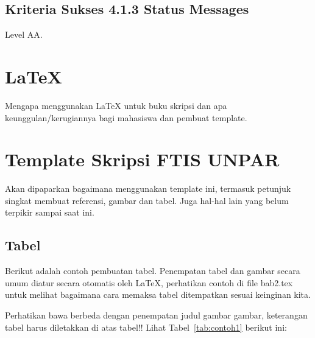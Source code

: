 \subsection{Kriteria Sukses 4.1.3 Status Messages}
\label{sec:kriteria_4.1.3}
Level AA.

\section{\LaTeX}
\label{sec:latex}

Mengapa menggunakan \LaTeX{} untuk buku skripsi dan apa keunggulan/kerugiannya bagi mahasiswa dan pembuat template. 



\section{Template Skripsi FTIS UNPAR}
\label{sec:template}
 
Akan dipaparkan bagaimana menggunakan template ini, termasuk petunjuk singkat membuat referensi, gambar dan tabel.
Juga hal-hal lain yang belum terpikir sampai saat ini. 
 

\subsection{Tabel}  
Berikut adalah contoh pembuatan tabel. 
Penempatan tabel dan gambar secara umum diatur secara otomatis oleh \LaTeX{}, perhatikan contoh di file bab2.tex untuk melihat bagaimana cara memaksa tabel ditempatkan sesuai keinginan kita.

Perhatikan bawa berbeda dengan penempatan judul gambar gambar, keterangan tabel harus diletakkan di atas tabel!!
Lihat Tabel~\ref{tab:contoh1} berikut ini:

